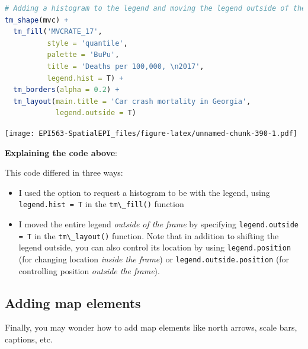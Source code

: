 \documentclass[
]{book}
\newcommand{\passthrough}[1]{#1}
\providecommand{\tightlist}{%
  \setlength{\itemsep}{0pt}\setlength{\parskip}{0pt}}
\begin{document}
\begin{lstlisting}[language=R]
# Adding a histogram to the legend and moving the legend outside of the frame
tm_shape(mvc) +
  tm_fill('MVCRATE_17',
          style = 'quantile',
          palette = 'BuPu',
          title = 'Deaths per 100,000, \n2017',
          legend.hist = T) +
  tm_borders(alpha = 0.2) +
  tm_layout(main.title = 'Car crash mortality in Georgia',
            legend.outside = T)
\end{lstlisting}

\texttt{[image: EPI563-SpatialEPI\_files/figure-latex/unnamed-chunk-390-1.pdf]}

\textbf{Explaining the code above}:

This code differed in three ways:

\begin{itemize}
\tightlist
\item
  I used the option to request a histogram to be with the legend, using \passthrough{\lstinline!legend.hist = T!} in the \passthrough{\lstinline!tm\_fill()!} function
\item
  I moved the entire legend \emph{outside of the frame} by specifying \passthrough{\lstinline!legend.outside = T!} in the \passthrough{\lstinline!tm\_layout()!} function. Note that in addition to shifting the legend outside, you can also control its location by using \passthrough{\lstinline!legend.position!} (for changing location \emph{inside the frame}) or \passthrough{\lstinline!legend.outside.position!} (for controlling position \emph{outside the frame}).
\end{itemize}

\hypertarget{adding-map-elements}{%
\subsection{Adding map elements}\label{adding-map-elements}}

Finally, you may wonder how to add map elements like north arrows, scale bars, captions, etc.
\end{document}
